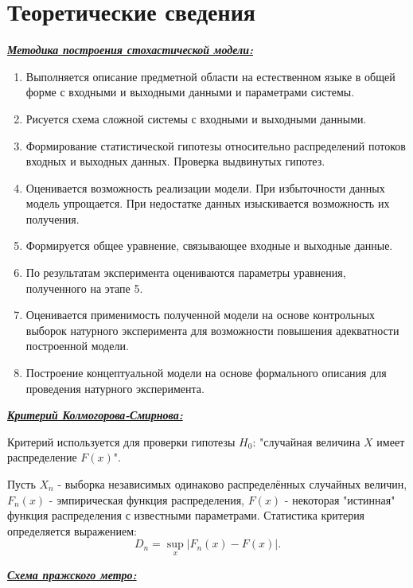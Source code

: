 \documentclass[a4paper, 12pt]{article}   	%
\begin{document}
\section{Теоретические сведения}
    \textit{\textbf{\underline{Методика построения стохастической модели:}}}
    \begin{enumerate}
        \item Выполняется описание предметной области на естественном языке в общей форме с входными и выходными данными и параметрами системы.
        \item Рисуется схема сложной системы с входными и выходными данными.
        \item Формирование статистической гипотезы относительно распределений потоков входных и выходных данных. Проверка выдвинутых гипотез.
        \item Оценивается возможность реализации модели. При избыточности данных модель упрощается. При недостатке данных изыскивается возможность их получения.
        \item Формируется общее уравнение, связывающее входные и выходные данные.
        \item По результатам эксперимента оцениваются параметры уравнения, полученного на этапе 5.
        \item Оценивается применимость полученной модели на основе контрольных выборок натурного эксперимента для возможности повышения адекватности построенной модели.
        \item Построение концептуальной модели на основе формального описания для проведения натурного эксперимента.
    \end{enumerate}
    
    \textit{\textbf{\underline{Критерий Колмогорова-Смирнова:}}}
    
    Критерий используется для проверки гипотезы $H_0$: "случайная величина $X$ имеет распределение $F(x)$".
    
    Пусть $X_n$ - выборка независимых одинаково распределённых случайных величин, $F_n(x)$ - эмпирическая функция распределения, $F(x)$ - некоторая "истинная" функция распределения с известными параметрами. Статистика критерия определяется выражением:
    \begin{equation}
        D_n=\sup_x |F_n(x)-F(x)|.
    \end{equation}
    
    \textit{\textbf{\underline{Схема пражского метро:}}}
    
\end{document}
